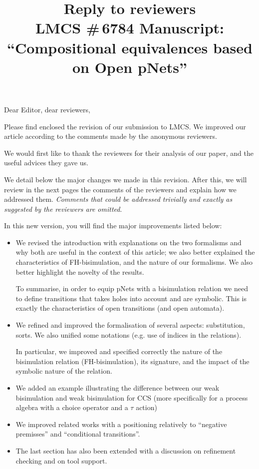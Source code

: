 \documentclass{article}
\title{Reply to reviewers\\
LMCS \#\,6784 Manuscript: \\``Compositional equivalences based on Open pNets'' }
\begin{document}
\maketitle
\noindent
Dear Editor, dear reviewers,

Please find enclosed the revision of our submission to LMCS. We improved our article according to the comments made by the
anonymous reviewers.

We would first like to thank the reviewers for their analysis of our
paper, and the useful advices they gave us.

We detail below the major changes we made in this revision. After
this, we will review in the next pages the comments of the reviewers
and explain how we addressed them.  \emph{Comments that could be
  addressed trivially and exactly as suggested by the reviewers are
  omitted}.  \medskip

In this new version, you will find the major improvements listed below:
\begin{itemize}
\item We revised the introduction with explanations on the two formalisms and why both are useful in the context of this article; we also better explained the characteristics of FH-bisimulation, and the nature of our formalisms. We also better highlight the novelty of the results.

To summarise, in order to equip  pNets with a bisimulation relation we need to define transitions that takes holes into account and are symbolic. This is exactly the characteristics of open transitions (and open automata).
\item We refined and improved the formalisation of several aspects: substitution, sorts. We also unified some notations (e.g. use of indices in the relations).

 In particular, we improved and specified correctly the nature of the bisimulation relation (FH-bisimulation), its signature, and the impact of the symbolic nature of the relation.

\item We added an example illustrating the difference between our weak bisimulation and weak bisimulation for CCS (more specifically for a process algebra with a choice operator and a $\tau$ action)

\item We improved related works with a positioning relatively to ``negative premisses'' and ``conditional transitions''.

\item The last section has also been extended with a discussion on refinement checking and on tool support.
\end{itemize}
\end{document}
